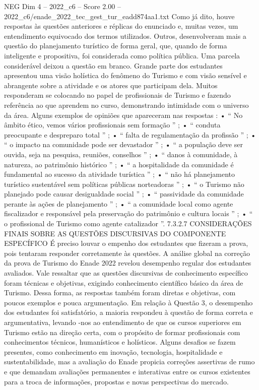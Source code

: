 \begin{textsample}{NEG Dim 4 – 2022\_c6 – Score 2.00 – 2022\_c6/enade\_2022\_tec\_gest\_tur\_eadd874aa1.txt}
Como já dito, houve respostas às questões anteriores e réplicas do enunciado e, muitas vezes, um entendimento equivocado dos termos utilizados.
Outros, desenvolveram mais a questão do planejamento turístico de forma geral, que, quando de forma inteligente e propositiva, foi considerada como política pública.
Uma parcela considerável deixou a questão em branco.
Grande parte dos estudantes apresentou uma visão holística do fenômeno do Turismo e com visão sensível e abrangente sobre a atividade e os atores que participam dela.
Muitos responderam se colocando no papel de profissionais de Turismo e fazendo referência ao que aprendem no curso, demonstrando intimidade com o universo da área.
Alguns exemplos de opiniões que apareceram nas respostas : • “ No âmbito ético, vemos vários profissionais sem formação ” ; • “ conduta preocupante e despreparo total ” ; • “ falta de regulamentação da profissão ” ; • “ o impacto na comunidade pode ser devastador ” ; • “ a população deve ser ouvida, seja na pesquisa, reuniões, conselhos ” ; • “ danos à comunidade, à natureza, ao patrimônio histórico ” ; • “ a hospitalidade da comunidade é fundamental ao sucesso da atividade turística ” ; • “ não há planejamento turístico sustentável sem políticas públicas norteadoras ” ; • “ o Turismo não planejado pode causar desigualdade social ” ; • “ passividade da comunidade perante às ações de planejamento ” ; • “ a comunidade local como agente fiscalizador e responsável pela preservação do patrimônio e cultura locais ” ; • “ o profissional de Turismo como agente catalizador ”. 7.3.2.7 CONSIDERAÇÕES FINAIS SOBRE AS QUESTÕES DISCURSIVAS DO COMPONENTE ESPECÍFICO É preciso louvar o empenho dos estudantes que fizeram a prova, pois tentaram responder corretamente às questões.
A análise global na correção da prova de Turismo do Enade 2022 revelou desempenho regular dos estudantes avaliados.
Vale ressaltar que as questões discursivas de conhecimento específico foram técnicas e objetivas, exigindo conhecimento científico básico da área de Turismo.
Dessa forma, as respostas também foram diretas e objetivas, com poucos exemplos e pouca argumentação.
Em relação à Questão 3, o desempenho dos estudantes foi satisfatório, a maioria respondeu à questão de forma correta e argumentativa, levando -nos ao entendimento de que os cursos superiores em Turismo estão na direção certa, com o propósito de formar profissionais com conhecimentos técnicos, humanísticos e holísticos.
Alguns desafios se fazem presentes, como conhecimento em inovação, tecnologia, hospitalidade e sustentabilidade, mas a avaliação do Enade propicia correções assertivas de rumo e que demandam avaliações permanentes e interativas entre os cursos existentes para a troca de informações, propostas e novas perspectivas do mercado.

\end{textsample}
